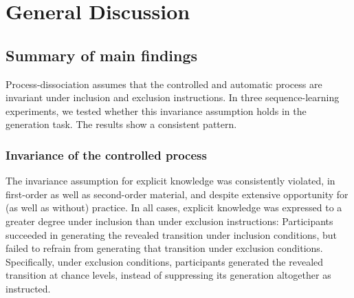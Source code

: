 \documentclass[floatsintext,man]{apa6}
\begin{document}
\section{General Discussion}\label{general-discussion}

\subsection{Summary of main findings}\label{summary-of-main-findings}

Process-dissociation assumes that the controlled and automatic process
are invariant under inclusion and exclusion instructions. In three
sequence-learning experiments, we tested whether this invariance
assumption holds in the generation task. The results show a consistent
pattern.

\subsubsection{Invariance of the controlled
process}\label{invariance-of-the-controlled-process}

The invariance assumption for explicit knowledge was consistently
violated, in first-order as well as second-order material, and despite
extensive opportunity for (as well as without) practice. In all cases,
explicit knowledge was expressed to a greater degree under inclusion
than under exclusion instructions: Participants succeeded in generating
the revealed transition under inclusion conditions, but failed to
refrain from generating that transition under exclusion conditions.
Specifically, under exclusion conditions, participants generated the
revealed transition at chance levels, instead of suppressing its
generation altogether as instructed.
\end{document}
